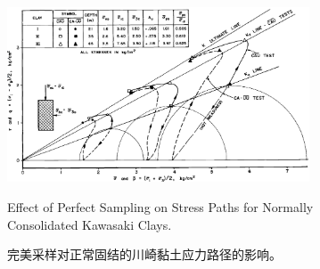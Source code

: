 \begin{figure}[!htb]
    \centering
    \includegraphics[width=0.8\textwidth]{figures/figure-2.png}
    \caption{Effect of Perfect Sampling on Stress Paths for Normally Consolidated Kawasaki Clays.}
    \addtocounter{figure}{-1}
    \vspace{-5pt}
    \renewcommand{\figurename}{图}
    \caption{完美采样对正常固结的川崎黏土应力路径的影响。}
    \renewcommand{\figurename}{Figure}
    \label{figure:2}
\end{figure}